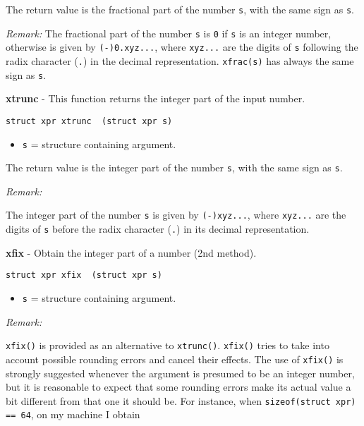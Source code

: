 \documentclass{article}
\begin{document}
The return value is the fractional part of the number \texttt{s}, with
the same sign as \texttt{s}.

\textit{Remark:}
The fractional part of the number \texttt{s} is \texttt{0} if \texttt{s} is an
integer number, otherwise is given by \texttt{(-)0.xyz...},  where 
\texttt{xyz...}  are the digits of \texttt{s} following the radix character
(\texttt{.}) in the decimal representation. \texttt{xfrac(s)} has always
the same sign as \texttt{s}.


\hrulefill{}

\textbf{xtrunc} - This function returns the integer part of the input number.

\begin{verbatim}
struct xpr xtrunc  (struct xpr s)
\end{verbatim}

\begin{itemize}
\item \texttt{s} = structure containing argument.
\end{itemize}

The return value is the integer part of the number \texttt{s}, with
the same sign as \texttt{s}.

\textit{Remark:}

The integer part of the number \texttt{s} is given by  \texttt{(-)xyz...},  where 
\texttt{xyz...}  are the digits of \texttt{s} before the radix character (\texttt{.}) in
its decimal representation.


\hrulefill{}

\textbf{xfix} - Obtain the integer part of a number (2nd method).

\begin{verbatim}
struct xpr xfix  (struct xpr s)
\end{verbatim}

\begin{itemize}
\item \texttt{s} = structure containing argument.
\end{itemize}

\textit{Remark:}

\texttt{xfix()} is provided as an alternative to \texttt{xtrunc()}. \texttt{xfix()} tries
to take into account possible rounding errors and cancel their
effects. The use of \texttt{xfix()} is strongly suggested whenever the argument
is presumed to be an integer number, but it is reasonable to expect 
that some rounding errors make its actual value a bit different from 
that one it should be.
For instance, when \texttt{sizeof(struct xpr) == 64}, on my machine I
obtain
\end{document}
